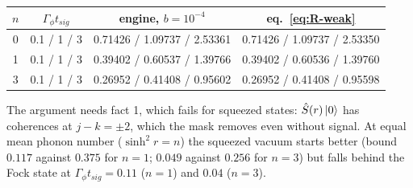 \begin{center}
\begin{tabular}{c c c c}
\hline
$n$ & $\Gamma_\phi t_{sig}$ & engine, $b = 10^{-4}$ & eq.~\eqref{eq:R-weak} \\
\hline
0 & 0.1 / 1 / 3 & 0.71426 / 1.09737 / 2.53361 & 0.71426 / 1.09737 / 2.53350 \\
1 & 0.1 / 1 / 3 & 0.39402 / 0.60537 / 1.39766 & 0.39402 / 0.60536 / 1.39760 \\
3 & 0.1 / 1 / 3 & 0.26952 / 0.41408 / 0.95602 & 0.26952 / 0.41408 / 0.95598 \\
\hline
\end{tabular}
\end{center}

The argument needs fact 1, which fails for squeezed states: $\hat{S}(r)\ket{0}$ has coherences at $j - k = \pm2$, which the mask removes even without signal. At equal mean phonon number ($\sinh^2 r = n$) the squeezed vacuum starts better (bound $0.117$ against $0.375$ for $n = 1$; $0.049$ against $0.256$ for $n = 3$) but falls behind the Fock state at $\Gamma_\phi t_{sig} = 0.11$ ($n = 1$) and $0.04$ ($n = 3$).

